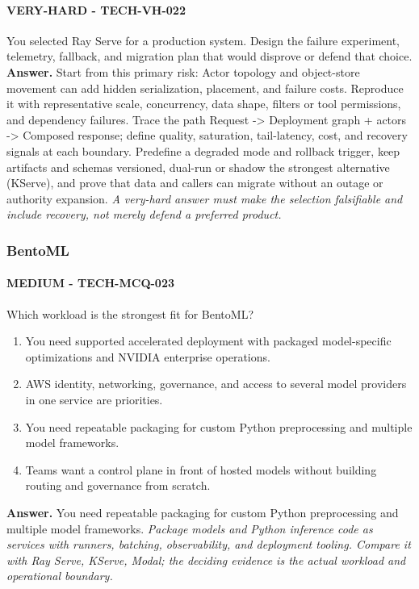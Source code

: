 \paragraph{VERY-HARD - TECH-VH-022} You selected Ray Serve for a production system. Design the failure experiment, telemetry, fallback, and migration plan that would disprove or defend that choice.
\textbf{Answer.} Start from this primary risk: Actor topology and object-store movement can add hidden serialization, placement, and failure costs. Reproduce it with representative scale, concurrency, data shape, filters or tool permissions, and dependency failures. Trace the path Request -> Deployment graph + actors -> Composed response; define quality, saturation, tail-latency, cost, and recovery signals at each boundary. Predefine a degraded mode and rollback trigger, keep artifacts and schemas versioned, dual-run or shadow the strongest alternative (KServe), and prove that data and callers can migrate without an outage or authority expansion.
\textit{A very-hard answer must make the selection falsifiable and include recovery, not merely defend a preferred product.}
\subsubsection*{BentoML}
\paragraph{MEDIUM - TECH-MCQ-023} Which workload is the strongest fit for BentoML?
\begin{enumerate}[label=\Alph*.]
\item You need supported accelerated deployment with packaged model-specific optimizations and NVIDIA enterprise operations.
\item AWS identity, networking, governance, and access to several model providers in one service are priorities.
\item You need repeatable packaging for custom Python preprocessing and multiple model frameworks.
\item Teams want a control plane in front of hosted models without building routing and governance from scratch.
\end{enumerate}
\textbf{Answer.} You need repeatable packaging for custom Python preprocessing and multiple model frameworks.
\textit{Package models and Python inference code as services with runners, batching, observability, and deployment tooling. Compare it with Ray Serve, KServe, Modal; the deciding evidence is the actual workload and operational boundary.}
